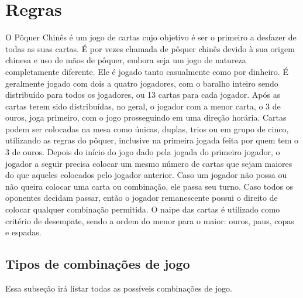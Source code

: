 \documentclass[12pt]{article}
\begin{document}
\section{Regras}
\label{regras}

O Pôquer Chinês é um jogo de cartas cujo objetivo é ser o primeiro a desfazer de todas as suas cartas. É por vezes chamada de pôquer chinês devido à sua origem chinesa e uso de mãos de pôquer, embora seja um jogo de natureza completamente diferente.
Ele é jogado tanto casualmente como por dinheiro. É geralmente jogado com dois a quatro jogadores, com o baralho inteiro sendo distribuído para todos os jogadores, ou 13 cartas para cada jogador.
Após as cartas terem sido distribuídas, no geral, o jogador com a menor carta, o 3 de ouros, joga primeiro, com o jogo prosseguindo em uma direção horária. Cartas podem ser colocadas na mesa como únicas, duplas, trios ou em grupo de cinco, utilizando as regras do pôquer, inclusive na primeira jogada feita por quem tem o 3 de ouros.
Depois do início do jogo dado pela jogada do primeiro jogador, o jogador a seguir precisa colocar um mesmo número de cartas que sejam maiores do que aqueles colocados pelo jogador anterior. Caso um jogador não possa ou não queira colocar uma carta ou combinação, ele passa seu turno. Caso todos os oponentes decidam passar, então o jogador remanescente possui o direito de colocar qualquer combinação permitida. O naipe das cartas é utilizado como critério de desempate, sendo a ordem do menor para o maior: ouros, paus, copas e espadas.

\subsection{Tipos de combinações de jogo}
\vspace{0.2 true cm}

Essa subseção irá listar todas as possíveis combinações de jogo.
\end{document}
